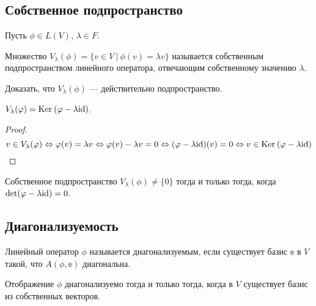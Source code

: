 \subsection*{Собственное подпространство}

Пусть $\phi\in L(V)$, $\lambda\in F$. 

\begin{Def}
    Множество $V_{\lambda}(\phi) = \{v\in V\ |\ \phi(v) = \lambda v\}$ называется собственным подпространством линейного оператора, отвечающим собственному значению $\lambda$.
\end{Def}

\begin{Task}
Доказать, что $V_\lambda(\phi)$ --- действительно подпространство.
\end{Task}

\begin{Suggestion}
$V_\lambda(\varphi) = \mathrm{Ker}\:(\varphi - \lambda\mathrm{id})$.
\end{Suggestion}
\begin{proof}
    $$
    v \in V_{\lambda}(\varphi) \Leftrightarrow \varphi(v) = \lambda v \Leftrightarrow \varphi(v) - \lambda v = 0 \Leftrightarrow (\varphi - \lambda \mathrm{id})(v) = 0  \Leftrightarrow v \in \mathrm{Ker}\:(\varphi - \lambda \mathrm{id})
    $$
\end{proof}
\begin{Consequence}
    Собственное подпространство $V_{\lambda}(\phi) \neq \{0\}$ тогда и только тогда, когда \\$\det(\varphi - \lambda \mathrm{id}) = 0$.
\end{Consequence}

\subsection*{Диагонализуемость}
\begin{Def}
    Линейный оператор $\phi$ называется диагонализуемым, если существует базис $\mathbb{e}$ в $V$ такой, что $A(\phi, \mathbb{e})$ диагональна. 
\end{Def}
\begin{Suggestion}
    Отображение $\phi$ диагонализуемо тогда и только тогда, когда в $V$ существует базис из собственных векторов.
\end{Suggestion}

